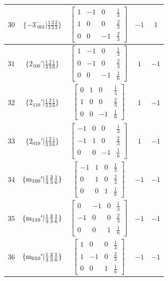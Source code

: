 \documentclass[fleqn,8pt]{jsarticle}
\begin{document}
\begin{longtable}{ccccc}
$ 30 $ & $ \{-3^{-}_{\,\,001}|\frac{1}{3} \frac{2}{3} \frac{2}{3}\} $ & $ \begin{bmatrix} 1 & -1 & 0 & \frac{1}{3} \\ 1 & 0 & 0 & \frac{2}{3} \\ 0 & 0 & -1 & \frac{2}{3} \end{bmatrix} $ & $ -1 $ & $ 1 $ \\ \hline
$ 31 $ & $ \{2{}_{100}{}'|\frac{1}{3} \frac{2}{3} \frac{1}{6}\} $ & $ \begin{bmatrix} 1 & -1 & 0 & \frac{1}{3} \\ 0 & -1 & 0 & \frac{2}{3} \\ 0 & 0 & -1 & \frac{1}{6} \end{bmatrix} $ & $ 1 $ & $ -1 $ \\ \hline
$ 32 $ & $ \{2{}_{110}{}'|\frac{1}{3} \frac{2}{3} \frac{1}{6}\} $ & $ \begin{bmatrix} 0 & 1 & 0 & \frac{1}{3} \\ 1 & 0 & 0 & \frac{2}{3} \\ 0 & 0 & -1 & \frac{1}{6} \end{bmatrix} $ & $ 1 $ & $ -1 $ \\ \hline
$ 33 $ & $ \{2{}_{010}{}'|\frac{1}{3} \frac{2}{3} \frac{1}{6}\} $ & $ \begin{bmatrix} -1 & 0 & 0 & \frac{1}{3} \\ -1 & 1 & 0 & \frac{2}{3} \\ 0 & 0 & -1 & \frac{1}{6} \end{bmatrix} $ & $ 1 $ & $ -1 $ \\ \hline
$ 34 $ & $ \{{\rm m}_{100}{}'|\frac{1}{3} \frac{2}{3} \frac{1}{6}\} $ & $ \begin{bmatrix} -1 & 1 & 0 & \frac{1}{3} \\ 0 & 1 & 0 & \frac{2}{3} \\ 0 & 0 & 1 & \frac{1}{6} \end{bmatrix} $ & $ -1 $ & $ -1 $ \\ \hline
$ 35 $ & $ \{{\rm m}_{110}{}'|\frac{1}{3} \frac{2}{3} \frac{1}{6}\} $ & $ \begin{bmatrix} 0 & -1 & 0 & \frac{1}{3} \\ -1 & 0 & 0 & \frac{2}{3} \\ 0 & 0 & 1 & \frac{1}{6} \end{bmatrix} $ & $ -1 $ & $ -1 $ \\ \hline
$ 36 $ & $ \{{\rm m}_{010}{}'|\frac{1}{3} \frac{2}{3} \frac{1}{6}\} $ & $ \begin{bmatrix} 1 & 0 & 0 & \frac{1}{3} \\ 1 & -1 & 0 & \frac{2}{3} \\ 0 & 0 & 1 & \frac{1}{6} \end{bmatrix} $ & $ -1 $ & $ -1 $ \\
\end{longtable}
\end{document}
